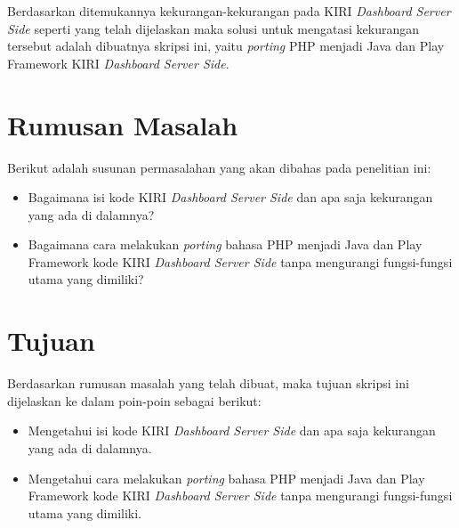 \documentclass[a4paper,twoside]{article}
\begin{document}
Berdasarkan ditemukannya kekurangan-kekurangan pada KIRI \textit{Dashboard Server Side} seperti yang telah dijelaskan maka solusi untuk mengatasi kekurangan tersebut adalah dibuatnya skripsi ini, yaitu \textit{porting} PHP menjadi Java dan Play Framework KIRI \textit{Dashboard Server Side}.

\section{Rumusan Masalah}
Berikut adalah susunan permasalahan yang akan dibahas pada penelitian ini:
	\begin{itemize}
		\item Bagaimana isi kode KIRI \textit{Dashboard Server Side} dan apa saja kekurangan yang ada di dalamnya?
		\item Bagaimana cara melakukan \textit{porting} bahasa PHP menjadi Java dan Play Framework kode KIRI \textit{Dashboard Server Side} tanpa mengurangi fungsi-fungsi utama yang dimiliki?
	\end{itemize}

\section{Tujuan}
	Berdasarkan rumusan masalah yang telah dibuat, maka tujuan skripsi ini dijelaskan ke dalam poin-poin sebagai berikut:
	\begin{itemize}
		\item Mengetahui isi kode KIRI \textit{Dashboard Server Side} dan apa saja kekurangan yang ada di dalamnya.
		\item Mengetahui cara melakukan \textit{porting} bahasa PHP menjadi Java dan Play Framework kode KIRI \textit{Dashboard Server Side} tanpa mengurangi fungsi-fungsi utama yang dimiliki.
	\end{itemize}
	
\end{document}
